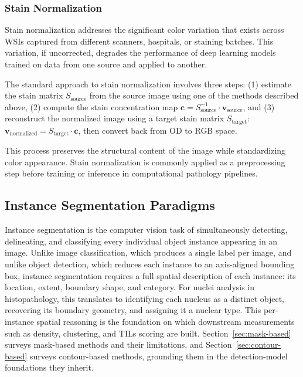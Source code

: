 \subsubsection{Stain Normalization}

Stain normalization addresses the significant color variation that exists across WSIs captured from different scanners, hospitals, or staining batches. This variation, if uncorrected, degrades the performance of deep learning models trained on data from one source and applied to another.

The standard approach to stain normalization involves three steps: (1) estimate the stain matrix $S_{\text{source}}$ from the source image using one of the methods described above, (2) compute the stain concentration map $\mathbf{c} = S_{\text{source}}^{-1} \cdot \mathbf{v}_{\text{source}}$, and (3) reconstruct the normalized image using a target stain matrix $S_{\text{target}}$: $\mathbf{v}_{\text{normalized}} = S_{\text{target}} \cdot \mathbf{c}$, then convert back from OD to RGB space.

This process preserves the structural content of the image while standardizing color appearance. Stain normalization is commonly applied as a preprocessing step before training or inference in computational pathology pipelines.


\subsection{Instance Segmentation Paradigms}
\label{sec:instance-seg}

Instance segmentation is the computer vision task of simultaneously detecting, delineating, and classifying every individual object instance appearing in an image. Unlike image classification, which produces a single label per image, and unlike object detection, which reduces each instance to an axis-aligned bounding box, instance segmentation requires a full spatial description of each instance: its location, extent, boundary shape, and category. For nuclei analysis in histopathology, this translates to identifying each nucleus as a distinct object, recovering its boundary geometry, and assigning it a nuclear type. This per-instance spatial reasoning is the foundation on which downstream measurements such as density, clustering, and TILs scoring are built. Section~\ref{sec:mask-based} surveys mask-based methods and their limitations, and Section~\ref{sec:contour-based} surveys contour-based methods, grounding them in the detection-model foundations they inherit.

